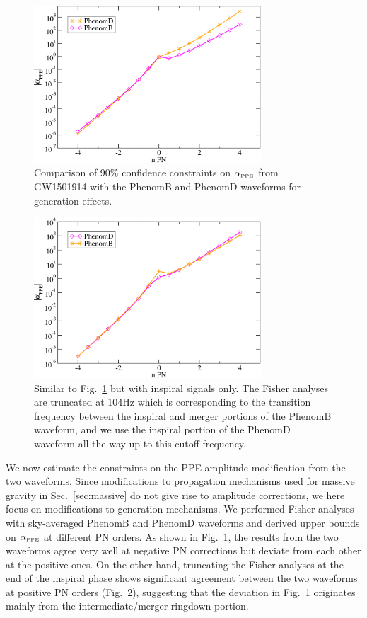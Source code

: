 \documentclass[prd,twocolumn,nofootinbib]{revtex4-1}
\newcommand{\PPE}{{\mbox{\tiny PPE}}}
\begin{document}
\begin{figure}[htb]
\includegraphics[width=8.5cm]{phenomBvsphenomD.pdf}
\caption{Comparison of 90\% confidence constraints on $\alpha_{\PPE}$ from GW1501914 with the PhenomB and PhenomD waveforms for generation effects. }
\label{fig:phenomBvsD}
\end{figure}

\begin{figure}[htb]
\includegraphics[width=8.5cm]{phenomBvsphenomD-insp.pdf}
\caption{Similar to Fig.~\ref{fig:phenomBvsD} but with inspiral signals only. The Fisher analyses are truncated at 104Hz which is corresponding to the transition frequency between the inspiral and merger portions of the PhenomB waveform, and we use the inspiral portion of the PhenomD waveform all the way up to this cutoff frequency.}
\label{fig:phenomBvsD-insp}
\end{figure}

We now estimate the constraints on the PPE amplitude modification from the two waveforms. Since modifications to propagation mechanisms used for massive gravity in Sec.~\ref{sec:massive} do not give rise to amplitude corrections, we here focus on modifications to generation mechanisms. We performed Fisher analyses with sky-averaged PhenomB and PhenomD waveforms and derived upper bounds on $\alpha_{\PPE}$ at different PN orders. As shown in Fig.~\ref{fig:phenomBvsD}, the results from the two waveforms agree very well at negative PN corrections but deviate from each other at the positive ones. 
On the other hand, truncating the Fisher analyses at the end of the inspiral phase shows significant agreement between the two waveforms at positive PN orders (Fig.~\ref{fig:phenomBvsD-insp}), suggesting that the deviation in Fig.~\ref{fig:phenomBvsD} originates mainly from the intermediate/merger-ringdown portion.
\end{document}
